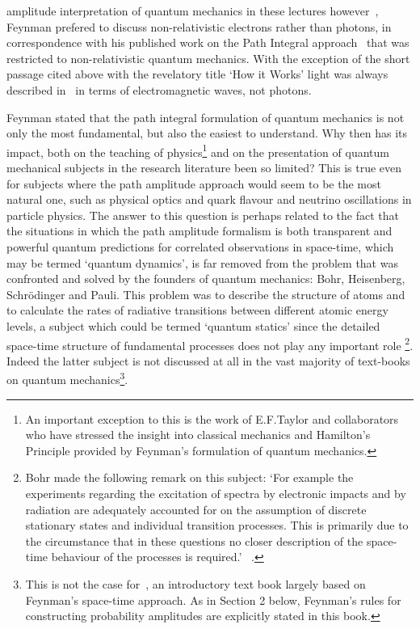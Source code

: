 \documentclass [12pt]{article}
\begin{document}
 amplitude interpretation of quantum mechanics in these lectures however~\cite{Feyn4}, Feynman
 prefered to discuss non-relativistic electrons rather than photons, in correspondence with
 his published work on the Path Integral approach~\cite{Feyn5,Feyn6} that was restricted
 to non-relativistic quantum mechanics. With the exception of the short passage cited
 above with the revelatory title `How it Works' light was always described in~\cite{Feyn2} 
 in terms of electromagnetic waves, not photons. 
 \par Feynman stated that the path integral formulation of quantum mechanics is not
 only the most fundamental, but also the easiest to understand. Why then has its impact,
 both on the teaching of physics\footnote{An important exception to this is the work of 
   E.F.Taylor and collaborators~\cite{EFT} who have stressed the insight into classical
   mechanics and Hamilton's Principle provided by Feynman's formulation of quantum mechanics.}
   and on the presentation of quantum mechanical subjects in the research literature
  been so limited? This is true even for subjects where the path amplitude approach 
  would seem to be the most natural one, such as physical optics and quark flavour and
   neutrino oscillations in particle physics. The answer to this question is perhaps
  related to the fact that the situations in which the path amplitude formalism
  is both transparent and powerful quantum predictions for correlated observations
  in space-time, which may be termed `quantum dynamics', is far removed from the problem
   that was confronted and solved by the founders of quantum mechanics: Bohr, Heisenberg,
   Schr\"{o}dinger and Pauli. This problem was to describe the structure of atoms and to
   calculate the rates of radiative transitions between different atomic energy levels,
   a subject which could be termed `quantum statics' since the detailed space-time
   structure of fundamental processes does not play any important role%
    \footnote{Bohr made the following remark on this subject:
     `For example the experiments regarding the excitation of spectra 
    by electronic impacts and by radiation are adequately accounted for on the 
   assumption of discrete stationary states and individual transition
   processes. This is primarily due to the circumstance that in these questions
   no closer description of the space-time behaviour of the processes is required.'
   ~\cite{BohrCI}.}. Indeed the latter
   subject is not discussed at all in the vast majority of text-books on 
  quantum mechanics\footnote{ This is not the case for~\cite{LLFB}, an introductory
  text book largely based on Feynman's space-time approach. As in Section 2 below,
   Feynman's rules for constructing probability amplitudes are explicitly stated
   in this book.}.
\end{document}
